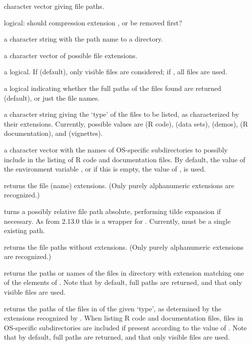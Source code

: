 %
\begin{Arguments}
\begin{ldescription}
\item[\code{x}] character vector giving file paths.
\item[\code{compression}] logical: should compression extension ,
 or  be removed first?
\item[\code{dir}] a character string with the path name to a directory.
\item[\code{exts}] a character vector of possible file extensions.
\item[\code{all.files}] a logical.  If  (default), only visible
files are considered; if , all files are used.
\item[\code{full.names}] a logical indicating whether the full paths of the
files found are returned (default), or just the file names.
\item[\code{type}] a character string giving the `type' of the files
to be listed, as characterized by their extensions.  Currently,
possible values are  (R code),  (data
sets),  (demos),  (R documentation), and
 (vignettes).
\item[\code{OS\_subdirs}] a character vector with the names of OS-specific
subdirectories to possibly include in the listing of R code and
documentation files.  By default, the value of the environment
variable , or if this is empty, the value of
, is used.
\end{ldescription}
\end{Arguments}
%
\begin{Details}\relax
{} returns the file (name) extensions.
(Only purely alphanumeric extensions are recognized.)

 turns a possibly relative file path
absolute, performing tilde expansion if necessary. As from \R{} 2.13.0
this is a wrapper for .  Currently,
 must be a single existing path.

 returns the file paths without extensions.
(Only purely alphanumeric extensions are recognized.)

 returns the paths or names of the files in
directory  with extension matching one of the elements of
.  Note that by default, full paths are returned, and that
only visible files are used.

 returns the paths of the files in 
of the given `type', as determined by the extensions recognized
by \R{}.  When listing R code and documentation files, files in
OS-specific subdirectories are included if present according to the
value of .  Note that by default, full paths are
returned, and that only visible files are used.
\end{Details}
